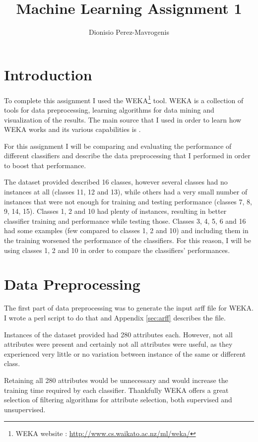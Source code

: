 \documentclass[12pt,twocolumn,a4paper]{article}
\begin{document}
\author{Dionisio Perez-Mavrogenis}
\title{Machine Learning Assignment 1}
\maketitle

\section{Introduction}
To complete this assignment I used the WEKA\footnote{WEKA website : \href{http://www.cs.waikato.ac.nz/ml/weka/}{http://www.cs.waikato.ac.nz/ml/weka/}} tool. WEKA is a collection of tools for data preprocessing, learning algorithms for data mining and visualization of the results. The main source that I used in order to learn how WEKA works and its various capabilities is \citep{Witten2011}.

For this assignment I will be comparing and evaluating the performance of different classifiers and describe the data preprocessing that I performed in order to boost that performance.

The dataset provided described 16 classes, however several classes had no instances at all (classes 11, 12 and 13), while others had a very small number of instances that were not enough for training and testing performance (classes 7, 8, 9, 14, 15). Classes 1, 2 and 10 had plenty of instances, resulting in better classifier training and performance while testing those. Classes 3, 4, 5, 6 and 16 had some examples (few compared to classes 1, 2 and 10) and including them in the training worsened the performance of the classifiers. For this reason, I will be using classes 1, 2 and 10 in order to compare the classifiers' performances.

\section{Data Preprocessing}
The first part of data preprocessing was to generate the input arff file for WEKA. I wrote a perl script to do that and Appendix \ref{sec:arff} describes the file.

Instances of the dataset provided had 280 attributes each. However, not all attributes were present and certainly not all attributes were useful, as they experienced very little or no variation between instance of the same or different class.

Retaining all 280 attributes would be unnecessary and would increase the training time required by each classifier. Thankfully WEKA offers a great selection of filtering algorithms for attribute selection, both supervised and unsupervised.
\end{document}
